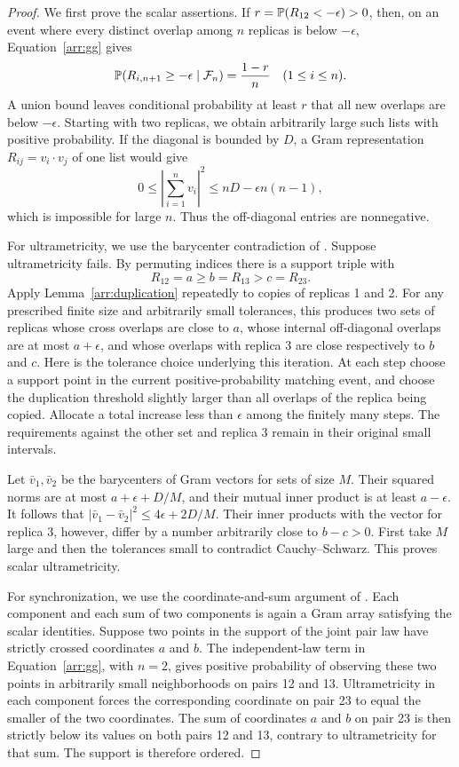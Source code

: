\begin{proof}
We first prove the scalar assertions. If
$r=\mathbb P(R_{12}< -\epsilon)>0$, then, on an event where every distinct
overlap among $n$ replicas is below $-\epsilon$, Equation~\eqref{arr:gg}
gives
\[
 \mathbb P(R_{i,n+1}\geq-\epsilon\mid\mathcal F_n)
 =\frac{1-r}{n}\quad(1\leq i\leq n).
\]
A union bound leaves conditional probability at least $r$ that all new
overlaps are below $-\epsilon$. Starting with two replicas, we obtain
arbitrarily large such lists with positive probability. If the diagonal
is bounded by $D$, a Gram representation $R_{ij}=v_i\cdot v_j$ of one
list would give
\[
 0\leq\left|\sum_{i=1}^n v_i\right|^2
 \leq nD-\epsilon n(n-1),
\]
which is impossible for large $n$. Thus the off-diagonal entries are
nonnegative.

For ultrametricity, we use the barycenter contradiction of
\cite[Section~3]{PanchenkoUltra}. Suppose ultrametricity fails. By
permuting indices there is a support
triple with
\[
 R_{12}=a\geq b=R_{13}>c=R_{23}.
\]
Apply Lemma~\ref{arr:duplication} repeatedly to copies of replicas 1
and 2. For any prescribed finite size and arbitrarily small tolerances,
this produces two sets of replicas whose cross overlaps are close to
$a$, whose internal off-diagonal overlaps are at most $a+\epsilon$,
and whose overlaps with replica 3 are close respectively to $b$ and $c$.
Here is the tolerance choice underlying this iteration. At each step
choose a support point in the current positive-probability matching
event, and choose the duplication threshold slightly larger than all
overlaps of the replica being copied. Allocate a total increase less
than $\epsilon$ among the finitely many steps. The requirements against
the other set and replica 3 remain in their original small intervals.

Let $\bar v_1,\bar v_2$ be the barycenters of Gram vectors for sets of
size $M$. Their squared norms are at most
$a+\epsilon+D/M$, and their mutual inner product is at least
$a-\epsilon$. It follows that
$|\bar v_1-\bar v_2|^2\leq4\epsilon+2D/M$. Their inner products with
the vector for replica 3, however, differ by a number arbitrarily close
to $b-c>0$. First take $M$ large and then the tolerances small to
contradict Cauchy--Schwarz. This proves scalar ultrametricity.

For synchronization, we use the coordinate-and-sum argument of
\cite[Section~4, Lemma~2]{PanchenkoMulti}. Each component and each sum
of two components is again a Gram array satisfying the scalar identities.
Suppose two points in the support of
the joint pair law have strictly crossed coordinates $a$ and $b$.
The independent-law term in Equation~\eqref{arr:gg}, with $n=2$,
gives positive probability of observing these two points in arbitrarily
small neighborhoods on pairs 12 and 13. Ultrametricity in each component
forces the corresponding coordinate on pair 23 to equal the smaller of
the two coordinates. The sum of coordinates $a$ and $b$ on pair 23 is
then strictly below its values on both pairs 12 and 13, contrary to
ultrametricity for that sum. The support is therefore ordered.


\end{proof}
